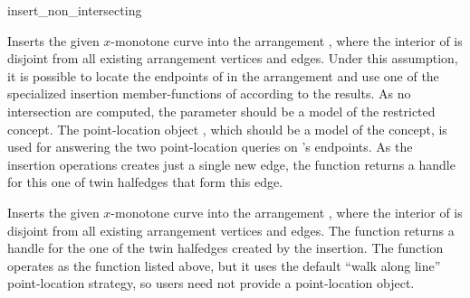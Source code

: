 
\ccRefPageBegin

\begin{ccRefFunction}{insert_non_intersecting}


   {Inserts the given $x$-monotone curve  into the arrangement
    , where the interior of  is disjoint from all existing
    arrangement vertices and edges. Under this assumption, it is possible to
    locate the endpoints of  in the arrangement and use one of the
    specialized insertion member-functions of  according to the
    results. As no intersection are computed, the  parameter
    should be a model of the restricted  concept.
    The point-location object , which should be a model of the
     concept, is used for answering
    the two point-location queries on 's endpoints. As the insertion
    operations creates just a single new edge, the function returns a handle
    for this one of twin halfedges that form this edge.
    }

   {Inserts the given $x$-monotone curve  into the arrangement
    , where the interior of  is disjoint from all existing
    arrangement vertices and edges. The function returns a handle for the
    one of the twin halfedges created by the insertion.
    The function operates as the function listed above, but it uses the default
    ``walk along line'' point-location strategy, so users need not provide a
    point-location object.}


\end{ccRefFunction}
